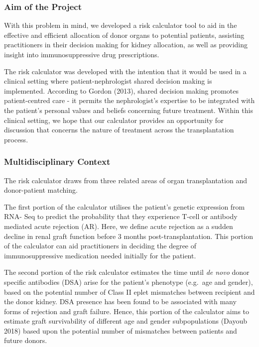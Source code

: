 \documentclass[a4paper,9pt,twocolumn,twoside,]{pinp}
\begin{document}
\hypertarget{aim-of-the-project}{%
\subsubsection{Aim of the Project}\label{aim-of-the-project}}

With this problem in mind, we developed a risk calculator tool to aid in
the effective and efficient allocation of donor organs to potential
patients, assisting practitioners in their decision making for kidney
allocation, as well as providing insight into immunosuppressive drug
prescriptions.

The risk calculator was developed with the intention that it would be
used in a clinical setting where patient-nephrologist shared decision
making is implemented. According to Gordon (2013), shared decision
making promotes patient-centred care - it permits the nephrologist's
expertise to be integrated with the patient's personal values and
beliefs concerning future treatment. Within this clinical setting, we
hope that our calculator provides an opportunity for discussion that
concerns the nature of treatment across the transplantation process.

\hypertarget{multidisciplinary-context}{%
\subsubsection{Multidisciplinary
Context}\label{multidisciplinary-context}}

The risk calculator draws from three related areas of organ
transplantation and donor-patient matching.

The first portion of the calculator utilises the patient's genetic
expression from RNA- Seq to predict the probability that they experience
T-cell or antibody mediated acute rejection (AR). Here, we define acute
rejection as a sudden decline in renal graft function before 3 months
post-transplantation. This portion of the calculator can aid
practitioners in deciding the degree of immunosuppressive medication
needed initially for the patient.

The second portion of the risk calculator estimates the time until
\emph{de novo} donor specific antibodies (DSA) arise for the patient's
phenotype (e.g.~age and gender), based on the potential number of Class
II eplet mismatches between recipient and the donor kidney. DSA presence
has been found to be associated with many forms of rejection and graft
failure. Hence, this portion of the calculator aims to estimate graft
survivability of different age and gender subpopulations (Dayoub 2018)
based upon the potential number of mismatches between patients and
future donors.
\end{document}
